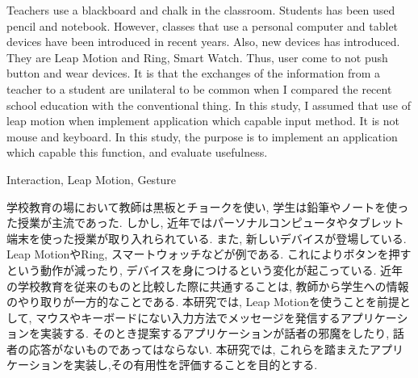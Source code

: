 \documentclass{funthesis}
\begin{document}
\maketitle       %

\begin{eabstract}
Teachers use a blackboard and chalk in the classroom. Students has been used pencil and notebook. However, classes that use a personal computer and tablet devices have been introduced in recent years. Also, new devices has introduced. They are Leap Motion and Ring, Smart Watch. Thus, user come to  not push button and wear devices. It is that the exchanges of the information from a teacher to a student are unilateral to be common when I compared the recent school education with the conventional thing. In this study, I assumed that use of leap motion when implement application which capable input method. It is not mouse and keyboard. In this study, the purpose is to implement an application which capable this function, and evaluate usefulness.
\end{eabstract}

\begin{ekeyword}
Interaction, Leap Motion, Gesture
\end{ekeyword}

\begin{jabstract}
学校教育の場において教師は黒板とチョークを使い, 学生は鉛筆やノートを使った授業が主流であった. しかし, 近年ではパーソナルコンピュータやタブレット端末を使った授業が取り入れられている. また, 新しいデバイスが登場している. Leap MotionやRing, スマートウォッチなどが例である. これによりボタンを押すという動作が減ったり, デバイスを身につけるという変化が起こっている. 近年の学校教育を従来のものと比較した際に共通することは, 教師から学生への情報のやり取りが一方的なことである. 本研究では, Leap Motionを使うことを前提として, マウスやキーボードにない入力方法でメッセージを発信するアプリケーションを実装する. そのとき提案するアプリケーションが話者の邪魔をしたり, 話者の応答がないものであってはならない. 本研究では, これらを踏まえたアプリケーションを実装し,その有用性を評価することを目的とする. 




\end{jabstract}
\end{document}
